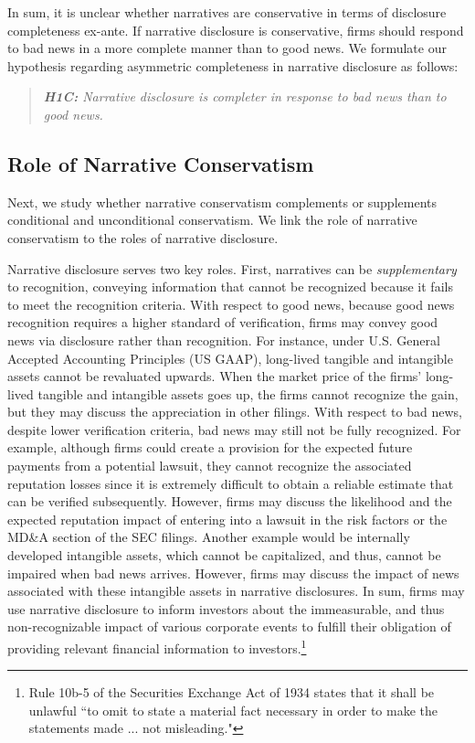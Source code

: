 \documentclass[letterpaper,12pt]{article}
\begin{document}
\begin{spacing}{1.5}
In sum, it is unclear whether narratives are conservative in terms of disclosure completeness ex-ante. If narrative disclosure is conservative, firms should respond to bad news in a more complete manner than to good news. We formulate our hypothesis regarding asymmetric completeness in narrative disclosure as follows:

\begin{quote}\label{hyp:h1c}
\textit{\textbf{H1C:} Narrative disclosure is completer in response to bad news than to good news.}
\end{quote}

\subsection{Role of Narrative Conservatism}\label{sec2.2}
\noindent Next, we study whether narrative conservatism complements or supplements conditional and unconditional conservatism. We link the role of narrative conservatism to the roles of narrative disclosure.

Narrative disclosure serves two key roles. First, narratives can be \textit{supplementary} to recognition, conveying information that cannot be recognized because it fails to meet the recognition criteria. With respect to good news, because good news recognition requires a higher standard of verification, firms may convey good news via disclosure rather than recognition. For instance, under U.S. General Accepted Accounting Principles (US GAAP), long-lived tangible and intangible assets cannot be revaluated upwards. When the market price of the firms' long-lived tangible and intangible assets goes up, the firms cannot recognize the gain, but they may discuss the appreciation in other filings. With respect to bad news, despite lower verification criteria, bad news may still not be fully recognized. For example, although firms could create a provision for the expected future payments from a potential lawsuit, they cannot recognize the associated reputation losses since it is extremely difficult to obtain a reliable estimate that can be verified subsequently. However, firms may discuss the likelihood and the expected reputation impact of entering into a lawsuit in the risk factors or the MD\&A section of the SEC filings. Another example would be internally developed intangible assets, which cannot be capitalized, and thus, cannot be impaired when bad news arrives. However, firms may discuss the impact of news associated with these intangible assets in narrative disclosures. In sum, firms may use narrative disclosure to inform investors about the immeasurable, and thus non-recognizable impact of various corporate events to fulfill their obligation of providing relevant financial information to investors.\footnote{Rule 10b-5 of the Securities Exchange Act of 1934 states that it shall be unlawful ``to omit to state a material fact necessary in order to make the statements made ... not misleading."}


\end{spacing}
\end{document}
